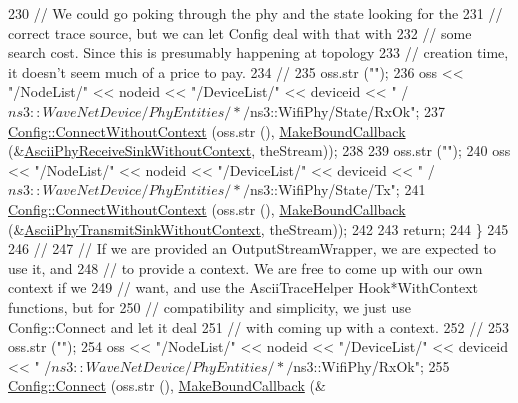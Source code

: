 \begin{DoxyCode}
230       \textcolor{comment}{// We could go poking through the phy and the state looking for the}
231       \textcolor{comment}{// correct trace source, but we can let Config deal with that with}
232       \textcolor{comment}{// some search cost.  Since this is presumably happening at topology}
233       \textcolor{comment}{// creation time, it doesn't seem much of a price to pay.}
234       \textcolor{comment}{//}
235       oss.str (\textcolor{stringliteral}{""});
236       oss << \textcolor{stringliteral}{"/NodeList/"} << nodeid << \textcolor{stringliteral}{"/DeviceList/"} << deviceid << \textcolor{stringliteral}{"
      /$ns3::WaveNetDevice/PhyEntities/*/$ns3::WifiPhy/State/RxOk"};
237       \hyperlink{group__config_gaa2f896aa7021f95fffabc80b2ec22e08}{Config::ConnectWithoutContext} (oss.str (), 
      \hyperlink{group__makeboundcallback_ga1725d6362e6065faa0709f7c93f8d770}{MakeBoundCallback} (&\hyperlink{namespacens3_a7ca07e06f80459c9c62e3b4e9eb6ff40}{AsciiPhyReceiveSinkWithoutContext}, 
      theStream));
238 
239       oss.str (\textcolor{stringliteral}{""});
240       oss << \textcolor{stringliteral}{"/NodeList/"} << nodeid << \textcolor{stringliteral}{"/DeviceList/"} << deviceid << \textcolor{stringliteral}{"
      /$ns3::WaveNetDevice/PhyEntities/*/$ns3::WifiPhy/State/Tx"};
241       \hyperlink{group__config_gaa2f896aa7021f95fffabc80b2ec22e08}{Config::ConnectWithoutContext} (oss.str (), 
      \hyperlink{group__makeboundcallback_ga1725d6362e6065faa0709f7c93f8d770}{MakeBoundCallback} (&\hyperlink{namespacens3_af1e94937b00eeb80a08c06ca300bfea5}{AsciiPhyTransmitSinkWithoutContext}, 
      theStream));
242 
243       \textcolor{keywordflow}{return};
244     \}
245 
246   \textcolor{comment}{//}
247   \textcolor{comment}{// If we are provided an OutputStreamWrapper, we are expected to use it, and}
248   \textcolor{comment}{// to provide a context.  We are free to come up with our own context if we}
249   \textcolor{comment}{// want, and use the AsciiTraceHelper Hook*WithContext functions, but for}
250   \textcolor{comment}{// compatibility and simplicity, we just use Config::Connect and let it deal}
251   \textcolor{comment}{// with coming up with a context.}
252   \textcolor{comment}{//}
253   oss.str (\textcolor{stringliteral}{""});
254   oss << \textcolor{stringliteral}{"/NodeList/"} << nodeid << \textcolor{stringliteral}{"/DeviceList/"} << deviceid << \textcolor{stringliteral}{"
      /$ns3::WaveNetDevice/PhyEntities/*/$ns3::WifiPhy/RxOk"};
255   \hyperlink{group__config_ga4014f151241cd0939b6cb64409605736}{Config::Connect} (oss.str (), \hyperlink{group__makeboundcallback_ga1725d6362e6065faa0709f7c93f8d770}{MakeBoundCallback} (&

\end{DoxyCode}
